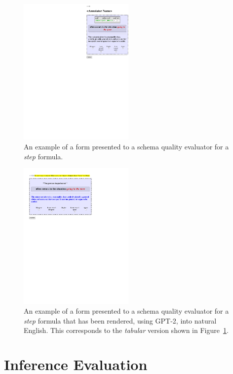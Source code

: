 \begin{figure}
    \centering
    \includegraphics[width=0.5\textwidth]{CH4_learning/evaleg3.pdf}
    \caption{An example of a form presented to a schema quality evaluator for a \textit{step} formula.}
    \label{fig:step_eval_eg}
\end{figure}

\begin{figure}
    \centering
    \includegraphics[width=0.5\textwidth]{CH5_eval/gpteval}
    \caption{An example of a form presented to a schema quality evaluator for a \textit{step} formula that has been rendered, using GPT-2, into natural English. This corresponds to the \textit{tabular} version shown in Figure~\ref{fig:step_eval_eg}.}
    \label{fig:gpt_step_eval_eg}
\end{figure}

\section{Inference Evaluation}
\label{sec:inf_eval}

